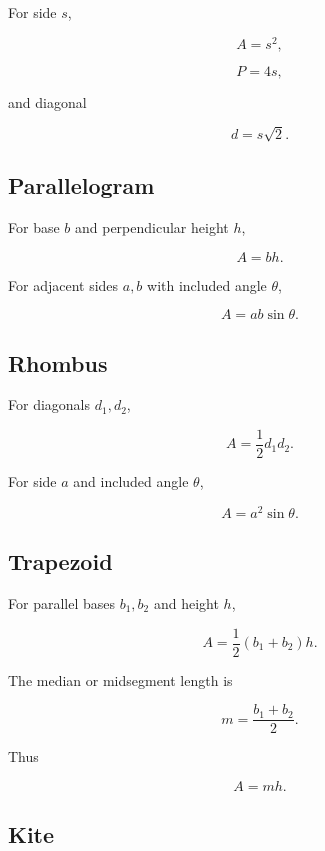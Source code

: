For side \(s\),

\[
\boxed{
A=s^2,
}
\]

\[
\boxed{
P=4s,
}
\]

and diagonal

\[
\boxed{
d=s\sqrt2.
}
\]

\subsection{Parallelogram}
\label{subsec:parallelogram-formulas}

For base \(b\) and perpendicular height \(h\),

\[
\boxed{
A=bh.
}
\]

For adjacent sides \(a,b\) with included angle \(\theta\),

\[
\boxed{
A
=
ab\sin\theta.
}
\]

\subsection{Rhombus}
\label{subsec:rhombus-formulas}

For diagonals \(d_1,d_2\),

\[
\boxed{
A
=
\frac12d_1d_2.
}
\]

For side \(a\) and included angle \(\theta\),

\[
\boxed{
A
=
a^2\sin\theta.
}
\]

\subsection{Trapezoid}
\label{subsec:trapezoid-formulas}

For parallel bases \(b_1,b_2\) and height \(h\),

\[
\boxed{
A
=
\frac12
(b_1+b_2)h.
}
\]

The median or midsegment length is

\[
\boxed{
m
=
\frac{b_1+b_2}{2}.
}
\]

Thus

\[
\boxed{
A=mh.
}
\]

\subsection{Kite}
\label{subsec:kite-formulas}

